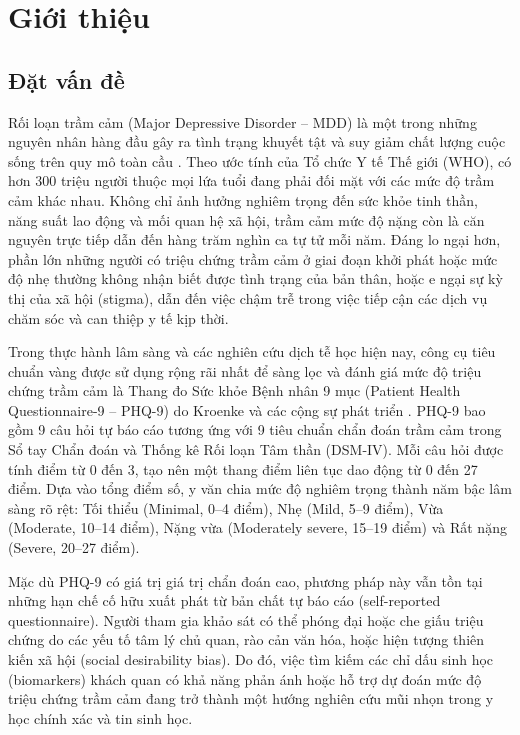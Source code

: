 \chapter{Giới thiệu}
\label{ch:gioi-thieu}

\section{Đặt vấn đề}
\label{sec:dat-van-de}

Rối loạn trầm cảm (Major Depressive Disorder -- MDD) là một trong những nguyên nhân hàng đầu gây ra tình trạng khuyết tật và suy giảm chất lượng cuộc sống trên quy mô toàn cầu \cite{pratt1991discriminant}. Theo ước tính của Tổ chức Y tế Thế giới (WHO), có hơn 300 triệu người thuộc mọi lứa tuổi đang phải đối mặt với các mức độ trầm cảm khác nhau. Không chỉ ảnh hưởng nghiêm trọng đến sức khỏe tinh thần, năng suất lao động và mối quan hệ xã hội, trầm cảm mức độ nặng còn là căn nguyên trực tiếp dẫn đến hàng trăm nghìn ca tự tử mỗi năm. Đáng lo ngại hơn, phần lớn những người có triệu chứng trầm cảm ở giai đoạn khởi phát hoặc mức độ nhẹ thường không nhận biết được tình trạng của bản thân, hoặc e ngại sự kỳ thị của xã hội (stigma), dẫn đến việc chậm trễ trong việc tiếp cận các dịch vụ chăm sóc và can thiệp y tế kịp thời.

Trong thực hành lâm sàng và các nghiên cứu dịch tễ học hiện nay, công cụ tiêu chuẩn vàng được sử dụng rộng rãi nhất để sàng lọc và đánh giá mức độ triệu chứng trầm cảm là Thang đo Sức khỏe Bệnh nhân 9 mục (Patient Health Questionnaire-9 -- PHQ-9) do Kroenke và các cộng sự phát triển \cite{kroenke2001phq, spitzer1999validation}. PHQ-9 bao gồm 9 câu hỏi tự báo cáo tương ứng với 9 tiêu chuẩn chẩn đoán trầm cảm trong Sổ tay Chẩn đoán và Thống kê Rối loạn Tâm thần (DSM-IV). Mỗi câu hỏi được tính điểm từ 0 đến 3, tạo nên một thang điểm liên tục dao động từ 0 đến 27 điểm. Dựa vào tổng điểm số, y văn chia mức độ nghiêm trọng thành năm bậc lâm sàng rõ rệt: Tối thiểu (Minimal, 0--4 điểm), Nhẹ (Mild, 5--9 điểm), Vừa (Moderate, 10--14 điểm), Nặng vừa (Moderately severe, 15--19 điểm) và Rất nặng (Severe, 20--27 điểm).

Mặc dù PHQ-9 có giá trị giá trị chẩn đoán cao, phương pháp này vẫn tồn tại những hạn chế cố hữu xuất phát từ bản chất tự báo cáo (self-reported questionnaire). Người tham gia khảo sát có thể phóng đại hoặc che giấu triệu chứng do các yếu tố tâm lý chủ quan, rào cản văn hóa, hoặc hiện tượng thiên kiến xã hội (social desirability bias). Do đó, việc tìm kiếm các chỉ dấu sinh học (biomarkers) khách quan có khả năng phản ánh hoặc hỗ trợ dự đoán mức độ triệu chứng trầm cảm đang trở thành một hướng nghiên cứu mũi nhọn trong y học chính xác và tin sinh học.

